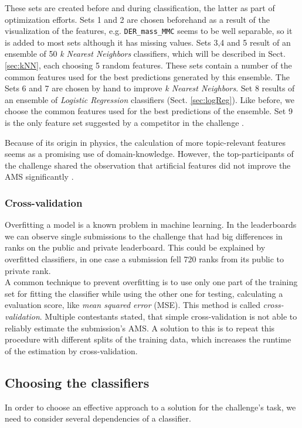 These sets are created before and during classification, the latter as part of optimization efforts. Sets 1 and 2 are chosen beforehand as a result of the visualization of the features, e.g. \texttt{DER\_mass\_MMC} seems to be well separable, so it is added to most sets although it has missing values. Sets 3,4 and 5 result of an ensemble of 50 \emph{k Nearest Neighbors} classifiers, which will be described in Sect. \ref{sec:kNN}, each choosing 5 random features. These sets contain a number of the common features used for the best predictions generated by this ensemble. The Sets 6 and 7 are chosen by hand to improve \emph{k Nearest Neighbors}. Set 8 results of an ensemble of \emph{Logistic Regression} classifiers (Sect. \ref{sec:logReg}). Like before, we choose the common features used for the best predictions of the ensemble. Set 9 is the only feature set suggested by a competitor in the challenge \cite{blog}.

Because of its origin in physics, the calculation of more topic-relevant features seems as a promising use of domain-knowledge. However, the top-participants of the challenge shared the observation that artificial features did not improve the AMS significantly \cite{melis-1st,salimans-2nd,courtiol-3rd}.

\subsubsection{Cross-validation}
Overfitting a model is a known problem in machine learning. In the leaderboards we can observe single submissions to the challenge that had big differences in ranks on the public and private leaderboard. This could be explained by overfitted classifiers, in one case a submission fell 720 ranks from its public to private rank. \\
A common technique to prevent overfitting is to use only one part of the training set for fitting the classifier while using the other one for testing, calculating a evaluation score, like \emph{mean squared error} (MSE). This method is called \emph{cross-validation}.  Multiple contestants stated, that simple cross-validation is not able to reliably estimate the submission's AMS. A solution to this is to repeat this procedure with different splits of the training data, which increases the runtime of the estimation by cross-validation.

\subsection{Choosing the classifiers}\label{sec:choice}
In order to choose an effective approach to a solution for the challenge's task, we need to consider several dependencies of a classifier.


